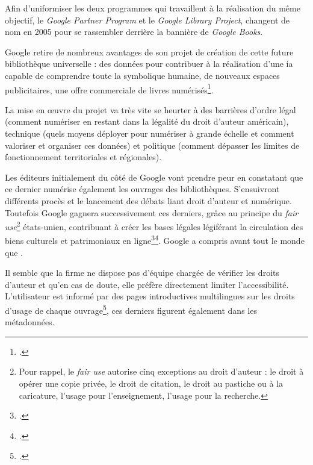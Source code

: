 Afin d'uniformiser les deux programmes qui travaillent à la réalisation du même objectif, le \textit{Google Partner Program} et le \textit{Google Library Project}, changent de nom en 2005 pour se rassembler derrière la bannière de \textit{Google Books}.

Google retire de nombreux avantages de son projet de création de cette future bibliothèque universelle : des données pour contribuer à la réalisation d'une \gls{ia} capable de comprendre toute la symbolique humaine, de nouveaux espaces publicitaires, une offre commerciale de livres numérisés\footcite{dufrene_numerisation_2013}.

La mise en \oe{}uvre du projet va très vite se heurter à des barrières d'ordre légal (comment  numériser en restant dans la légalité du droit d'auteur américain), technique (quels moyens déployer pour numériser à grande échelle et comment valoriser et organiser ces données) et politique (comment dépasser les limites de fonctionnement territoriales et régionales).

Les éditeurs initialement du côté de Google vont prendre peur en constatant que ce dernier numérise également les ouvrages des bibliothèques. S'ensuivront différents procès et le lancement des débats liant droit d'auteur et numérique. Toutefois Google gagnera successivement ces derniers, grâce au principe du \textit{fair use}\footnote{Pour rappel, le \textit{fair use} autorise cinq exceptions au droit d'auteur : le droit à opérer une copie privée, le droit de citation, le droit au pastiche ou à la caricature, l'usage pour l'enseignement, l'usage pour la recherche.} états-unien, contribuant à créer les bases légales légiférant la circulation des biens culturels et patrimoniaux en ligne\footcite{xie_discover_2016}\footcite{stobo_i_2018}. Google a compris avant tout le monde que . 

Il semble que la firme ne dispose pas d'équipe chargée de vérifier les droits d'auteur et qu'en cas de doute, elle préfère directement limiter l'accessibilité. L'utilisateur est informé par des pages introductives multilingues sur les droits d'usage de chaque ouvrage\footcite{leetaru_mass_2008}, ces derniers figurent également dans les métadonnées.


